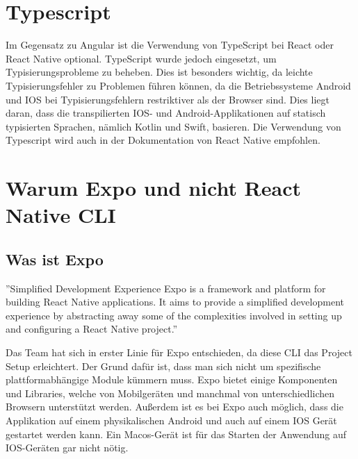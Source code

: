 \section{Typescript}
Im Gegensatz zu Angular ist die Verwendung von TypeScript bei React oder React Native optional. TypeScript wurde jedoch eingesetzt, um Typisierungsprobleme zu beheben. Dies ist besonders wichtig, da leichte Typisierungsfehler zu Problemen führen können, da die Betriebssysteme Android und IOS  bei Typisierungsfehlern restriktiver als der Browser sind. Dies liegt daran, dass die transpilierten IOS- und Android-Applikationen auf statisch typisierten Sprachen, nämlich Kotlin und Swift, basieren.
Die Verwendung von Typescript wird auch  in der Dokumentation von React Native empfohlen. \cite{typescript-with-react-native}


\section{Warum Expo und nicht React Native CLI}

\subsection{Was ist Expo}
''Simplified Development Experience Expo is a framework and platform for building React Native applications. It aims to provide a simplified development experience by abstracting away some of the complexities involved in setting up and configuring a React Native project.''\cite{expo}

Das Team hat sich in erster Linie für Expo entschieden, da diese CLI das Project Setup erleichtert.
Der Grund dafür ist, dass man sich nicht um spezifische plattformabhängige Module kümmern muss.
Expo bietet einige Komponenten und Libraries, welche von Mobilgeräten und manchmal von unterschiedlichen Browsern unterstützt werden.
Außerdem ist es bei Expo auch möglich,
dass die Applikation auf einem physikalischen Android und auch auf einem IOS Gerät gestartet werden kann.
Ein Macos-Gerät ist für das Starten der Anwendung auf IOS-Geräten gar nicht nötig. \cite{expo}